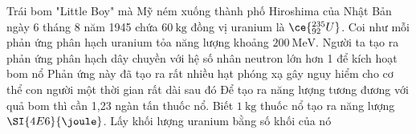 \begin{ex}
	Trái bom "Little Boy" mà Mỹ ném xuống thành phố Hiroshima của Nhật Bản ngày 6 tháng 8 năm 1945 chứa $\SI{60}{\kilogram}$ đồng vị uranium là $\ce{^{235}_{92}U}$. Coi như mỗi phản ứng phân hạch uranium tỏa năng lượng khoảng $\SI{200}{\mega\electronvolt}$.
	{\True Người ta tạo ra phản ứng phân hạch dây chuyền với hệ số nhân neutron lớn hơn 1 để kích hoạt bom nổ}
	{\True Phản ứng này đã tạo ra rất nhiều hạt phóng xạ gây nguy hiểm cho cơ thể con người một thời gian rất dài sau đó}
	{Để tạo ra năng lượng tương đương với quả bom thì cần 1,23 ngàn tấn thuốc nổ. Biết $\SI{1}{\kilogram}$ thuốc nổ tạo ra năng lượng $\SI{4E6}{\joule}$. Lấy khối lượng uranium bằng số khối của nó}
\end{ex}
